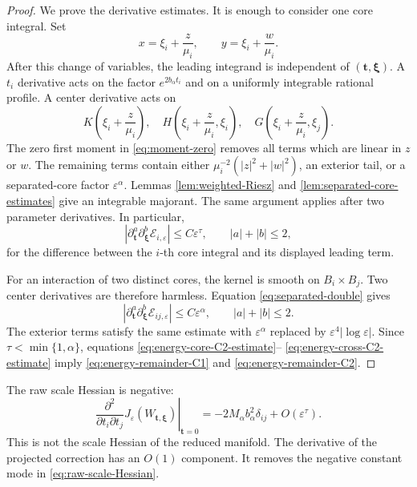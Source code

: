\documentclass[11pt]{article}
\numberwithin{equation}{section}
\begin{document}
\begin{proof}
We prove the derivative estimates.  It is enough to consider one
core integral.  Set
\[
x=\xi_i+\frac z{\mu_i},
\qquad
y=\xi_i+\frac w{\mu_i}.
\]
After this change of variables, the leading integrand is independent
of $(\boldsymbol t,\boldsymbol\xi)$.  A $t_i$ derivative acts on the
factor $e^{2b_\alpha t_i}$ and on a uniformly integrable rational
profile.  A center derivative acts on
\[
K\left(\xi_i+\frac z{\mu_i}\right),
\quad
H\left(\xi_i+\frac z{\mu_i},\xi_i\right),
\quad
G\left(\xi_i+\frac z{\mu_i},\xi_j\right).
\]
The zero first moment in \eqref{eq:moment-zero} removes all
terms which are linear in $z$ or $w$.  The remaining terms contain
either $\mu_i^{-2}(|z|^2+|w|^2)$, an exterior tail, or a separated-core
factor $\varepsilon^\alpha$.  Lemmas
\ref{lem:weighted-Riesz} and \ref{lem:separated-core-estimates}
give an integrable majorant.  The same argument applies after two
parameter derivatives.  In particular,
\begin{equation}\label{eq:energy-core-C2-estimate}
\left|
\partial_{\boldsymbol t}^{a}
\partial_{\boldsymbol\xi}^{b}
\mathcal E_{i,\varepsilon}
\right|
\leq C\varepsilon^\tau,
\qquad |a|+|b|\leq2,
\end{equation}
for the difference between the $i$-th core integral and its displayed
leading term.

For an interaction of two distinct cores, the kernel is smooth on
$B_i\times B_j$.  Two center derivatives are therefore harmless.
Equation \eqref{eq:separated-double} gives
\begin{equation}\label{eq:energy-cross-C2-estimate}
\left|
\partial_{\boldsymbol t}^{a}
\partial_{\boldsymbol\xi}^{b}
\mathcal E_{ij,\varepsilon}
\right|
\leq C\varepsilon^\alpha,
\qquad |a|+|b|\leq2.
\end{equation}
The exterior terms satisfy the same estimate with
$\varepsilon^\alpha$ replaced by $\varepsilon^4|\log\varepsilon|$.
Since $\tau<\min\{1,\alpha\}$, equations
\eqref{eq:energy-core-C2-estimate}--
\eqref{eq:energy-cross-C2-estimate} imply
\eqref{eq:energy-remainder-C1} and
\eqref{eq:energy-remainder-C2}.
\end{proof}

The raw scale Hessian is negative:
\begin{equation}\label{eq:raw-scale-Hessian}
\left.\frac{\partial^2}{\partial t_i\partial t_j}
J_\varepsilon(W_{\boldsymbol t,\boldsymbol\xi})\right|_{\boldsymbol t=0}
=-2M_\alpha b_\alpha^2\delta_{ij}+O(\varepsilon^\tau).
\end{equation}
This is not the scale Hessian of the reduced manifold. The derivative of the projected correction has an $O(1)$ component. It removes the negative constant mode in \eqref{eq:raw-scale-Hessian}.
\end{document}
